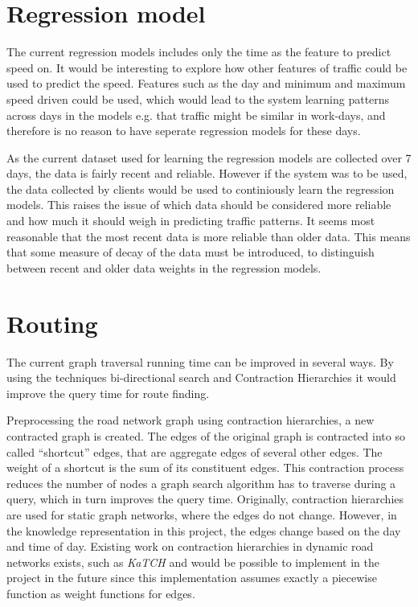 \section{Regression model}
The current regression models includes only the time as the feature to predict speed on. It would be interesting to explore how other features of traffic could be used to predict the speed. Features such as the day and minimum and maximum speed driven could be used, which would lead to the system learning patterns across days in the models e.g.  that traffic might be similar in work-days, and therefore is no reason to have seperate regression models for these days. 

As the current dataset used for learning the regression models are collected over 7 days, the data is fairly recent and reliable. However if the system was to be used, the data collected by clients would be used to continiously learn the regression models. This raises the issue of which data should be considered more reliable and how much it should weigh in predicting traffic patterns. It seems most reasonable that the most recent data is more reliable than older data. This means that some measure of decay of the data must be introduced, to distinguish between recent and older data weights in the regression models.

\section{Routing}
The current graph traversal running time can be improved in several ways. By using the techniques bi-directional search and Contraction Hierarchies it would improve the query time for route finding.

Preprocessing the road network graph using contraction hierarchies, a new contracted graph is created. The edges of the original graph is contracted into so called “shortcut” edges, that are aggregate edges of  several other edges. The weight of a shortcut is the sum of its constituent edges. This contraction process reduces the number of nodes a graph search algorithm has to traverse during a query, which in turn improves the query time. 
Originally, contraction hierarchies are used for static graph networks, where the edges do not change. However, in the knowledge representation in this project, the edges change based on the day and time of day. Existing work on  contraction hierarchies in dynamic road networks exists,  such as \emph{KaTCH}\cite{KaTCH}\cite{KaTCHi} and would be possible to implement in the project in the future since this implementation assumes exactly a piecewise function as weight functions for edges.

